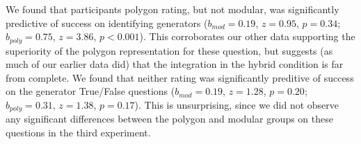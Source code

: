 \documentclass[man,10pt]{apa6}
\begin{document}
\noindent
We found that participants polygon rating, but not modular, was significantly predictive of success on identifying generators ($b_{mod} = 0.19$, $z = 0.95$, $p = 0.34$; $b_{poly} = 0.75$, $z = 3.86$, $p < 0.001$). This corroborates our other data supporting the superiority of the polygon representation for these question, but suggests (as much of our earlier data did) that the integration in the hybrid condition is far from complete. We found that neither rating was significantly preditive of success on the generator True/False questions ($b_{mod} = 0.19$, $z = 1.28$, $p = 0.20$; $b_{poly} = 0.31$, $z = 1.38$, $p = 0.17$). This is unsurprising, since we did not observe any significant differences between the polygon and modular groups on these questions in the third experiment. 
\end{document}
